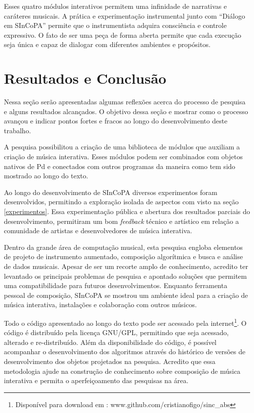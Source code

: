 \documentclass{ppgmus}
\begin{document}
Esses quatro módulos interativos permitem uma infinidade de narrativas e caráteres musicais.
A prática e experimentação instrumental junto com ``Diálogo em SInCoPA'' permite que o instrumentista 
adquira consciência e controle expressivo. O fato de ser uma peça de forma aberta permite que
cada execução seja única e capaz de dialogar com diferentes ambientes e propósitos.




\chapter{Resultados e Conclusão}
\label{sec:conclusao}

Nessa seção serão apresentadas algumas reflexões acerca
do processo de pesquisa e alguns resultados alcançados.
O objetivo dessa seção e mostrar como o processo avançou
e indicar pontos fortes e fracos ao longo do desenvolvimento deste trabalho.

A pesquisa possibilitou a criação de uma biblioteca de módulos que auxiliam
a criação de música interativa.	Esses módulos podem ser combinados com objetos
nativos de Pd e conectados com outros programas da maneira como tem sido
mostrado ao longo do texto.

Ao longo do desenvolvimento de SInCoPA diversos experimentos foram desenvolvidos,
permitindo a exploração isolada de aspectos com visto na seção \ref{experimentos}.
Essa experimentação pública e abertura dos resultados parciais do desenvolvimento, permitiram
um bom \textit{feedback} técnico e artístico em relação a comunidade de 
artistas e desenvolvedores de música interativa.


Dentro da grande área de computação musical, esta pesquisa engloba elementos de projeto
de instrumento aumentado, composição algorítmica e busca e análise de dados musicais.
Apesar de ser um recorte amplo de conhecimento, acredito ter levantado os principais
problemas de pesquisa e apontado soluções que permitem uma compatibilidade para futuros desenvolvimentos.
Enquanto ferramenta pessoal de composição, SInCoPA se mostrou um ambiente ideal
para a criação de música interativa, instalações e colaboração com outros
músicos.

Todo o código apresentado ao longo do texto pode ser acessado pela internet\footnote{Disponível
para download em : www.github.com/cristianofigo/sinc\_abs}. O código é distribuído
pela licença GNU/GPL, permitindo que seja acessado, alterado e re-distribuído.
Além da disponibilidade do código, é possível acompanhar o desenvolvimento dos
algoritmos através do histórico de versões de desenvolvimento dos objetos projetados
na pesquisa. Acredito que essa metodologia ajude na construção de conhecimento sobre
composição de música interativa e permita o aperfeiçoamento das pesquisas na área.
\end{document}

